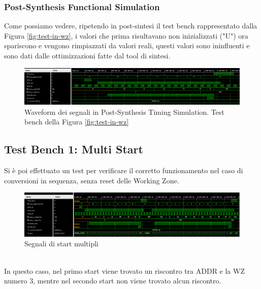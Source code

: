 \documentclass{article}
\begin{document}
\subsubsection{Post-Synthesis Functional Simulation}
\noindent Come possiamo vedere, ripetendo in post-sintesi il test bench rappresentato dalla Figura \ref{fig:test-in-wz}, i valori che prima risultavano non inizializzati ("U") ora spariscono e vengono rimpiazzati da valori reali, questi valori sono ininfluenti e sono dati dalle ottimizzazioni fatte dal tool di sintesi.\\
\begin{figure}[H]
    \centering
    \includegraphics[width=1.0\textwidth]{images/test-in-wz-post.png}
        \caption{Waveform dei segnali in Post-Synthesis Timing Simulation. Test bench della Figura \ref{fig:test-in-wz}}
    \label{fig:test-in-wz-post}
\end{figure}

\subsection{Test Bench 1: Multi Start}
Si è poi effettuato un test per verificare il corretto funzionamento nel caso di conversioni in sequenza, senza reset delle Working Zone.\\
\begin{figure}[H]
    \centering
    \includegraphics[width=1.0\textwidth]{images/test-multi-start.png}
        \caption{Segnali di start multipli}
    \label{fig:test-multi-start}
\end{figure}
\noindent\\ In questo caso, nel primo start viene trovato un riscontro tra ADDR e la WZ numero 3, mentre nel secondo start non viene trovato alcun riscontro.
\end{document}
